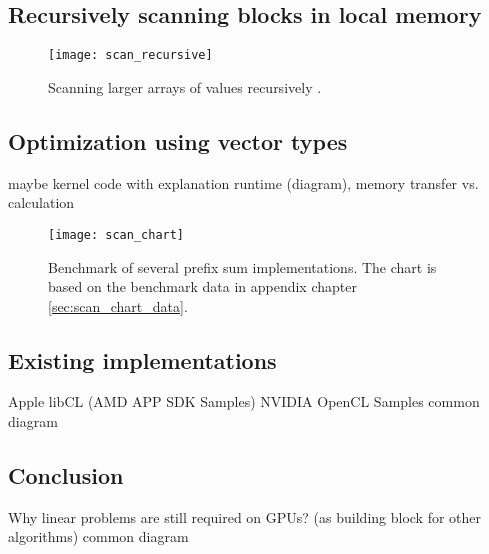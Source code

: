 \subsection{Recursively scanning blocks in local memory}

\begin{figure}
\centering
\texttt{[image: scan\_recursive]}
\caption{Scanning larger arrays of values recursively \cite{gpu_gems_3_chapter_39}.}
\label{fig:scan_recursive}
\end{figure}


\subsection{Optimization using vector types}


maybe kernel code with explanation
runtime (diagram), memory transfer vs. calculation

\begin{figure}
\centering
\texttt{[image: scan\_chart]}
\caption{Benchmark of several prefix sum implementations. The chart is based on the benchmark data in appendix chapter \ref{sec:scan_chart_data}.}
\label{fig:scan_chart}
\end{figure}

\subsection{Existing implementations}
Apple
libCL
(AMD APP SDK Samples)
NVIDIA OpenCL Samples
common diagram

\subsection{Conclusion}
Why linear problems are still required on GPUs? (as building block for other algorithms)
common diagram
